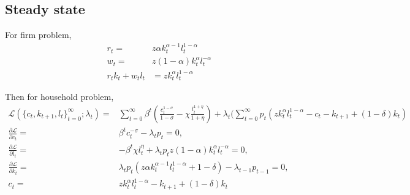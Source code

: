 \documentclass[]{article}
\begin{document}
\hypertarget{steady-state}{%
\subsection{Steady state}\label{steady-state}}

For firm problem, \begin{equation}
            \begin{split}
                r_t =&z\alpha k_t^{\alpha -1}l_t^{1-\alpha}\\
                w_t =&z(1-\alpha) k_t^{\alpha}l_t^{-\alpha}\\
                r_tk_t+w_tl_t&=zk_t^{\alpha}l_t^{1-\alpha}
            \end{split}
            \end{equation}

Then for household problem, \begin{equation}
            \begin{split}
                \mathcal{L}(\{c_t,k_{t+1},l_t\}_{t=0}^{\infty};\lambda_t)=&\sum_{t=0}^{\infty}
                \beta ^t(\frac{c_t^{1-\sigma}}{1-\sigma}-\chi \frac{l_t^{1+\eta}}{1+\eta})+\lambda_t(\sum_{t=0}^{\infty}p_t(zk_t^{\alpha}l_t^{1-\alpha}-c_t-k_{t+1}+(1-\delta)k_t)\\
                \frac{\partial \mathcal{L}}{\partial c_t}=&\beta^tc_t^{-\sigma}-\lambda_t p_t=0,\\
                \frac{\partial \mathcal{L}}{\partial l_t}=&-\beta^t\chi l_t^{\eta}+\lambda_t p_tz(1-\alpha) k_t^{\alpha}l_t^{-\alpha}=0,\\
                \frac{\partial \mathcal{L}}{\partial k_t}=&\lambda_t p_t(z\alpha k_t^{\alpha -1}l_t^{1-\alpha}+1-\delta)-\lambda_{t-1}p_{t-1}=0,\\
                c_t=&zk_t^{\alpha}l_t^{1-\alpha}-k_{t+1}+(1-\delta)k_t
            \end{split}
            \end{equation}
\end{document}
